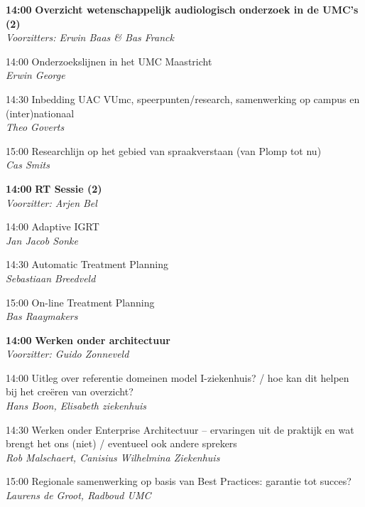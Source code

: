 \documentclass[a4paper,10pt]{report}
\begin{document}
\begin{multicols*}{3}
\vfill

\begin{packed_enum}
\item[\textbf{14:00}] \textbf{Overzicht wetenschappelijk audiologisch onderzoek in de UMC's (2)}\\\textit{Voorzitters: Erwin Baas \& Bas Franck}
\item[14:00] Onderzoekslijnen in het UMC Maastricht\\\textit{Erwin George} 
\item[14:30] Inbedding UAC VUmc, speerpunten/research, samenwerking op campus en (inter)nationaal\\\textit{Theo Goverts}
\item[15:00] Researchlijn op het gebied van spraakverstaan (van Plomp tot nu)\\\textit{Cas Smits}
\end{packed_enum}

\vfill

\begin{packed_enum}
\item[\textbf{14:00}] \textbf{RT Sessie (2)}\\\textit{Voorzitter: Arjen Bel}
\item[14:00] Adaptive IGRT\\\textit{Jan Jacob Sonke}
\item[14:30] Automatic Treatment Planning\\\textit{Sebastiaan Breedveld}
\item[15:00] On-line Treatment Planning\\\textit{Bas Raaymakers}
\end{packed_enum}

\vfill
{}
\begin{packed_enum}
\item[\textbf{14:00}] \textbf{Werken onder architectuur}\\\textit{Voorzitter: Guido Zonneveld}
\item[14:00] Uitleg over referentie domeinen model I-ziekenhuis? / hoe kan dit helpen bij het creëren van overzicht?\\\textit{Hans Boon, Elisabeth ziekenhuis}
\item[14:30] Werken onder Enterprise Architectuur – ervaringen uit de praktijk en wat brengt het ons (niet) / eventueel ook andere sprekers \\\textit{Rob Malschaert, Canisius Wilhelmina Ziekenhuis} 
\item[15:00] Regionale samenwerking op basis van Best Practices: garantie tot succes? \\\textit{Laurens de Groot, Radboud UMC} 
\end{packed_enum}


\end{multicols*}
\end{document}
